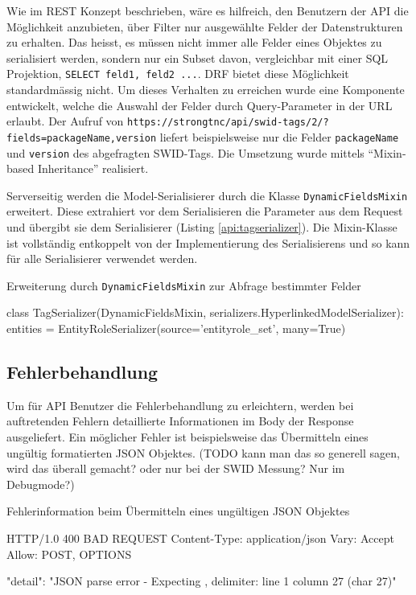 Wie im REST Konzept beschrieben, wäre es hilfreich, den
Benutzern der API die Möglichkeit anzubieten, über Filter nur ausgewählte Felder
der Datenstrukturen zu erhalten. Das heisst, es müssen nicht immer alle Felder
eines Objektes zu serialisiert werden, sondern nur ein Subset davon,
vergleichbar mit einer SQL Projektion, \texttt{SELECT feld1, feld2 ...}. DRF
bietet diese Möglichkeit standardmässig nicht. Um dieses Verhalten zu erreichen
wurde eine Komponente entwickelt, welche die Auswahl der Felder durch
Query-Parameter in der URL erlaubt. Der Aufruf von
\texttt{https://strongtnc/api/swid-tags/2/?fields=packageName,version} liefert
beispielsweise nur die Felder \texttt{packageName} und \texttt{version} des
abgefragten SWID-Tags. Die Umsetzung wurde mittels \enquote{Mixin-based
Inheritance}\cite{bracha1990mixin} realisiert.

Serverseitig werden die Model-Serialisierer durch die Klasse
\texttt{DynamicFieldsMixin} erweitert. Diese extrahiert vor dem Serialisieren
die Parameter aus dem Request und übergibt sie dem Serialisierer (Listing
\ref{api:tagserializer}). Die Mixin-Klasse ist vollständig entkoppelt von der
Implementierung des Serialisierens und so kann für alle Serialisierer verwendet
werden.

\begin{listing}
\caption{Erweiterung durch \texttt{DynamicFieldsMixin} zur Abfrage bestimmter Felder}
\label{api:tagserializer}
\begin{pythoncode}
class TagSerializer(DynamicFieldsMixin, serializers.HyperlinkedModelSerializer):
    entities = EntityRoleSerializer(source='entityrole_set', many=True)
\end{pythoncode}
\end{listing}

\subsection{Fehlerbehandlung}
Um für API Benutzer die Fehlerbehandlung zu erleichtern, werden bei auftretenden
Fehlern detaillierte Informationen im Body der Response ausgeliefert. Ein
möglicher Fehler ist beispielsweise das Übermitteln eines ungültig formatierten
JSON Objektes. (TODO kann man das so generell sagen, wird das überall gemacht?
oder nur bei der SWID Messung? Nur im Debugmode?)

\begin{listing}
\caption{Fehlerinformation beim Übermitteln eines ungültigen JSON Objektes}
\begin{httpcode}
HTTP/1.0 400 BAD REQUEST
Content-Type: application/json
Vary: Accept
Allow: POST, OPTIONS

{
    "detail": "JSON parse error - Expecting , delimiter: line 1 column 27 (char 27)"
}
\end{httpcode}
\end{listing}


